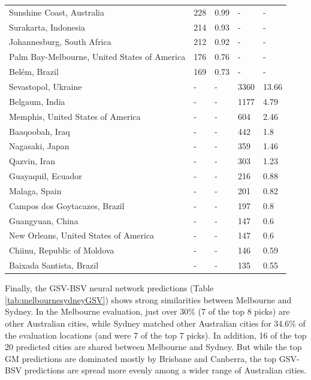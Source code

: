\documentclass[sageh,times]{sagej}
\begin{document}
\begin{table}[!htbp]
\begin{tabular}{ l  l l l  l}
Sunshine Coast, Australia & 228 & 0.99 &-&- \\ 
Surakarta, Indonesia & 214 & 0.93 &-&- \\ 
Johannesburg, South Africa & 212 & 0.92 &-&- \\ 
Palm Bay-Melbourne, United States of America & 176 & 0.76 &-&- \\ 
Bel\'{e}m, Brazil & 169 & 0.73 &-&- \\ 
Sevastopol, Ukraine &-&- & 3360 & 13.66\\ 
Belgaum, India &-&- & 1177 & 4.79\\ 
Memphis, United States of America &-&- & 604 & 2.46\\ 
Baaqoobah, Iraq &-&- & 442 & 1.8\\ 
Nagasaki, Japan &-&- & 359 & 1.46\\ 
Qazvin, Iran &-&- & 303 & 1.23\\ 
Guayaquil, Ecuador &-&- & 216 & 0.88\\ 
Malaga, Spain &-&- & 201 & 0.82\\ 
Campos dos Goytacazes, Brazil &-&- & 197 & 0.8\\ 
Guangyuan, China &-&- & 147 & 0.6\\ 
New Orleans, United States of America &-&- & 147 & 0.6\\ 
Chiinu, Republic of Moldova &-&- & 146 & 0.59\\ 
Baixada Santista, Brazil &-&- & 135 & 0.55\\ \hline
\end{tabular}
\end{table}


Finally, the GSV-BSV neural network predictions (Table \ref{tab:melbournesydneyGSV}) shows strong similarities between Melbourne and Sydney. In the Melbourne evaluation, just over 30\% (7 of the top 8 picks) are other Australian cities, while Sydney matched other Australian cities for 34.6\% of the evaluation locations (and were 7 of the top 7 picks). In addition, 16 of the top 20 predicted cities are shared between Melbourne and Sydney. But while the top GM predictions are dominated mostly by Brisbane and Canberra, the top GSV-BSV predictions are spread more evenly among a wider range of Australian cities.
\end{document}
